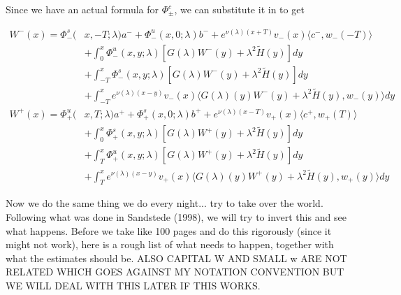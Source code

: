 \documentclass[12pt]{article}
\begin{document}
Since we have an actual formula for $\Phi^c_\pm$, we can substitute it in to get

\begin{align*}
W^-(x) = \Phi^s_-(&x, -T; \lambda)a^- + \Phi^u_-(x, 0; \lambda)b^- + e^{\nu(\lambda)(x+T)} v_-(x) \langle c^-, w_-(-T) \rangle \\
&+ \int_0^x \Phi^u_-(x, y; \lambda)[ G(\lambda)W^-(y) + \lambda^2 \tilde{H}(y) ] dy \\
&+ \int_{-T}^x \Phi^s_-(x, y; \lambda) [ G(\lambda)W^-(y) + \lambda^2 \tilde{H}(y) ] dy \\
&+ \int_{-T}^x 
e^{\nu(\lambda)(x-y)} v_-(x) \langle G(\lambda)(y)W^-(y) + \lambda^2 \tilde{H}(y), w_-(y) \rangle dy \\
W^+(x) = \Phi^u_+(&x, T; \lambda)a^+ + \Phi^s_+(x, 0; \lambda)b^+ + e^{\nu(\lambda)(x - T)} v_+(x) \langle c^+, w_+(T) \rangle \\
&+ \int_0^x \Phi^s_+(x, y; \lambda) [ G(\lambda)W^+(y) + \lambda^2 \tilde{H}(y) ] dy \\
&+ \int_T^x \Phi^u_+(x, y; \lambda) [ G(\lambda)W^+(y) + \lambda^2 \tilde{H}(y) ] dy \\
&+ \int_T^x e^{\nu(\lambda)(x-y)} v_+(x) \langle G(\lambda)(y)W^+(y) + \lambda^2 \tilde{H}(y), w_+(y) \rangle dy
\end{align*}

Now we do the same thing we do every night... try to take over the world. Following what was done in Sandstede (1998), we will try to invert this and see what happens. Before we take like 100 pages and do this rigorously (since it might not work), here is a rough list of what needs to happen, together with what the estimates should be. ALSO CAPITAL W AND SMALL w ARE NOT RELATED WHICH GOES AGAINST MY NOTATION CONVENTION BUT WE WILL DEAL WITH THIS LATER IF THIS WORKS.
\end{document}
